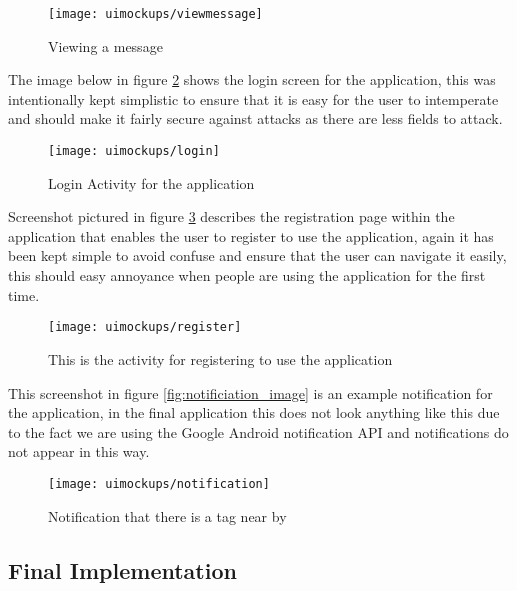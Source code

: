 \begin{figure}[h!]
    \centering
    \texttt{[image: uimockups/viewmessage]}
    \caption{Viewing a message}
    \label{fig:viewing_message_image}
\end{figure} 

\noindent
The image below in figure \ref{fig:login_activity_image} shows the login screen for the application, this was intentionally kept simplistic to ensure that it is easy for the user to intemperate and should make it fairly secure against attacks as there are less fields to attack.\\

\begin{figure}[h!]
    \centering
    \texttt{[image: uimockups/login]}
    \caption{Login Activity for the application}
    \label{fig:login_activity_image}
\end{figure} 

\noindent
Screenshot pictured in figure \ref{fig:registration_activity_image} describes the registration page within the application that enables the user to register to use the application, again it has been kept simple to avoid confuse and ensure that the user can navigate it easily, this should easy annoyance when people are using the application for the first time.\\

\begin{figure}[h!]
    \centering
    \texttt{[image: uimockups/register]}
    \caption{This is the activity for registering to use the application}
    \label{fig:registration_activity_image}
\end{figure} 

\noindent
This screenshot in figure \ref{fig:notificiation_image} is an example notification for the application, in the final application this does not look anything like this due to the fact we are using the Google Android notification API and notifications do not appear in this way.

\begin{figure}[h!]
    \centering
    \texttt{[image: uimockups/notification]}
    \caption{Notification that there is a tag near by}
    \label{fig:notification_image}
\end{figure} 
\noindent


\subsection{Final Implementation}


